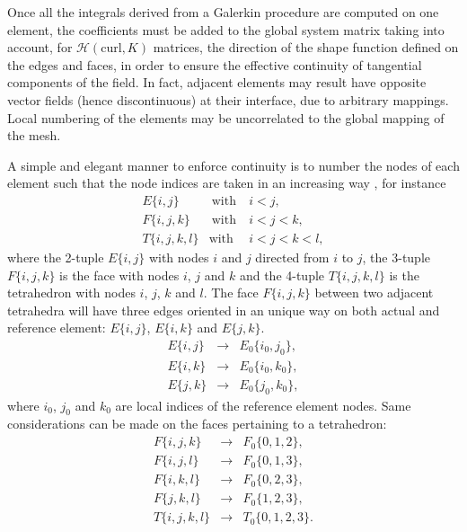
Once all the integrals derived from a Galerkin procedure are computed on one element, the coefficients must be added to the global system matrix taking into account, for $\mathcal{H}(\mathrm{curl},K)$ matrices, the direction of the shape function defined on the edges and faces, in order to ensure the effective continuity of tangential components of the field. In fact, adjacent elements may result have opposite vector fields (hence discontinuous) at their interface, due to arbitrary mappings. Local numbering of the elements may be uncorrelated to the global mapping of the mesh.

A simple and elegant manner to enforce continuity is to number the nodes of each element such that the node indices are taken in an increasing way \cite{rognes2009efficient}, for instance
\begin{eqnarray*}
E \lbrace i,j\rbrace & \ \text{with} & \ i < j,\\
F \lbrace i,j,k\rbrace & \ \text{with} & \ i < j < k,\\
T \lbrace i,j,k,l \rbrace & \text{with} & \ i < j < k < l,
\end{eqnarray*}
\noindent where the 2-tuple $E\lbrace i,j\rbrace$ with nodes $i$ and $j$ directed from $i$ to $j$, the 3-tuple $F\lbrace i,j,k\rbrace$ is the face with nodes $i$, $j$ and $k$ and the 4-tuple $T\lbrace i,j,k,l\rbrace$ is the tetrahedron with nodes  $i$, $j$, $k$ and $l$. The face $F\lbrace i,j,k\rbrace$ between two adjacent tetrahedra will have three edges oriented in an unique way on both actual and reference element: $E\lbrace i,j\rbrace $, $E\lbrace i,k\rbrace$ and $E \lbrace j,k\rbrace$. 
\begin{eqnarray*}
E\lbrace i,j\rbrace  & \longrightarrow & E_0\lbrace i_0,j_0\rbrace,\\
E\lbrace i,k\rbrace & \longrightarrow & E_0\lbrace i_0,k_0\rbrace,\\
E \lbrace j,k\rbrace & \longrightarrow & E_0\lbrace j_0,k_0\rbrace,
\end{eqnarray*}
\noindent where $i_0$, $j_0$ and $k_0$ are local indices of the reference element nodes. Same considerations can be made on the faces pertaining to a tetrahedron:
\begin{eqnarray*}
F\lbrace i,j,k\rbrace & \longrightarrow & F_0\lbrace 0,1,2\rbrace,\\
F\lbrace i,j,l\rbrace & \longrightarrow & F_0\lbrace 0,1,3\rbrace,\\
F\lbrace i,k,l\rbrace & \longrightarrow & F_0\lbrace 0,2,3\rbrace,\\
F\lbrace j,k,l\rbrace & \longrightarrow & F_0\lbrace 1,2,3\rbrace,\\[5pt]
T\lbrace i,j,k,l\rbrace & \longrightarrow & T_0\lbrace 0,1,2,3\rbrace.
\end{eqnarray*}

